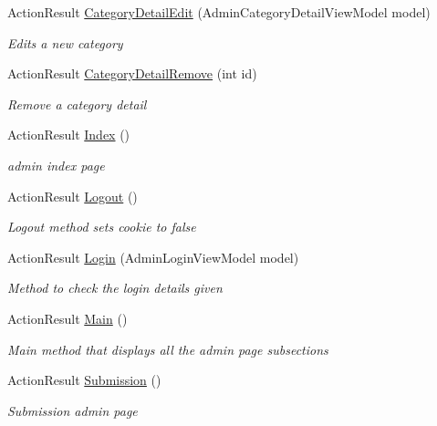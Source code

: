 \begin{DoxyCompactItemize}
Action\+Result \mbox{\hyperlink{class_ox_tots_1_1_controllers_1_1_admin_controller_aa0ecd42e85b6defa974871c6b10c2e2a}{Category\+Detail\+Edit}} (Admin\+Category\+Detail\+View\+Model model)
\begin{DoxyCompactList}\small\item\em Edits a new category \end{DoxyCompactList}\item 
Action\+Result \mbox{\hyperlink{class_ox_tots_1_1_controllers_1_1_admin_controller_a996e0fd06c3b3a4689c8d34e17be8b3e}{Category\+Detail\+Remove}} (int id)
\begin{DoxyCompactList}\small\item\em Remove a category detail \end{DoxyCompactList}\item 
Action\+Result \mbox{\hyperlink{class_ox_tots_1_1_controllers_1_1_admin_controller_a54c0e90ba396562dcafac0839bdb4b61}{Index}} ()
\begin{DoxyCompactList}\small\item\em admin index page \end{DoxyCompactList}\item 
Action\+Result \mbox{\hyperlink{class_ox_tots_1_1_controllers_1_1_admin_controller_abfbe3370ec891ee42b4a842a1b294797}{Logout}} ()
\begin{DoxyCompactList}\small\item\em Logout method sets cookie to false \end{DoxyCompactList}\item 
Action\+Result \mbox{\hyperlink{class_ox_tots_1_1_controllers_1_1_admin_controller_a7684ac84cb566b754ced7a3fbf2cfe45}{Login}} (Admin\+Login\+View\+Model model)
\begin{DoxyCompactList}\small\item\em Method to check the login details given \end{DoxyCompactList}\item 
Action\+Result \mbox{\hyperlink{class_ox_tots_1_1_controllers_1_1_admin_controller_a477e22f8c8c613cdb4d9fd5627268f25}{Main}} ()
\begin{DoxyCompactList}\small\item\em Main method that displays all the admin page subsections \end{DoxyCompactList}\item 
Action\+Result \mbox{\hyperlink{class_ox_tots_1_1_controllers_1_1_admin_controller_ab325e78a1c8c85393b5e4fd81d33307d}{Submission}} ()
\begin{DoxyCompactList}\small\item\em Submission admin page \end{DoxyCompactList}\item 

\end{DoxyCompactItemize}
